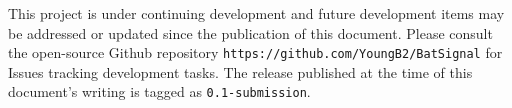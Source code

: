 \documentclass[11pt,a4paper]{article}
\begin{document}
This project is under continuing development and future development items may be addressed or updated since the publication of this document. Please consult the open-source Github repository \texttt{https://github.com/YoungB2/BatSignal} for Issues tracking development tasks. The release published at the time of this document's writing is tagged as \texttt{0.1-submission}. 
\end{document}

